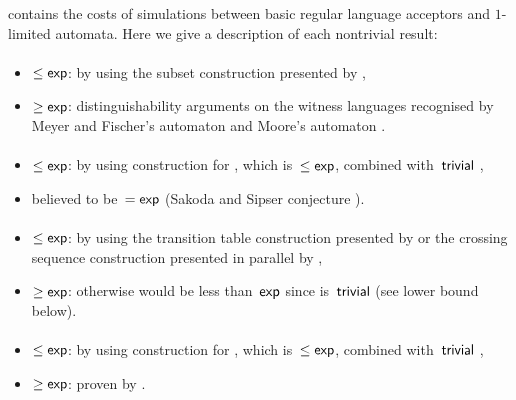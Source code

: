  contains the costs of simulations between basic regular language acceptors and $1$-limited automata.
Here we give a description of each nontrivial result:
\paragraph{\ONFA{}\tto\ODFA}\label{cost:1NFAto1DFA}
\begin{itemize}
	\item $\le\mathsf{exp}$: by using the subset construction presented by ,
	\item $\ge\mathsf{exp}$: distinguishability arguments on the witness languages recognised by Meyer and Fischer's automaton \cite{MeyFis71} and Moore's automaton \cite{Moo71}.
\end{itemize}
\paragraph{\ONFA{}\tto\TDFA}
\begin{itemize}
	\item $\le\mathsf{exp}$: by using construction for \hyperref[cost:1NFAto1DFA]{\ONFA{}\tto\ODFA}, which is~$\le\mathsf{exp}$, combined with~$\mathsf{trivial}$ \ODFA{}\tto\TDFA,
	\item believed to be~$=\mathsf{exp}$ (Sakoda and Sipser conjecture \cite{SakSip78}).
\end{itemize}
\paragraph{\TDFA{}\tto\ODFA}\label{cost:2DFAto1DFA}
\begin{itemize}
	\item $\le\mathsf{exp}$: by using the transition table construction presented by  or the crossing sequence construction presented in parallel by ,
	\item $\ge\mathsf{exp}$: otherwise \hyperref[cost:2DFAto1NFA]{\TDFA{}\tto\ONFA} would be less than~$\mathsf{exp}$ since \ODFA{}\tto\ONFA is~$\mathsf{trivial}$ (see lower bound below).
\end{itemize}
\paragraph{\TDFA{}\tto\ONFA}\label{cost:2DFAto1NFA}
\begin{itemize}
	\item $\le\mathsf{exp}$: by using construction for \hyperref[cost:2DFAto1DFA]{\TDFA{}\tto\ODFA}, which is~$\le\mathsf{exp}$, combined with~$\mathsf{trivial}$ \ODFA{}\tto\ONFA,
	\item $\ge\mathsf{exp}$: proven by .
\end{itemize}
